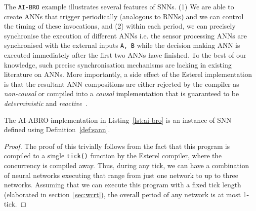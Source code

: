
The \texttt{AI-BRO} example illustrates several features of \acp{SNN}. (1) We are able to create \acp{ANN} that trigger periodically (analogous
to \acp{RNN}) and we can control the timing of these invocations, and (2) within each period, we can precisely synchronise the 
execution of different \acp{ANN} i.e. the sensor processing \acp{ANN} are synchronised with the external inputs 
\texttt{A, B} while the decision making \ac{ANN} is executed immediately after the first two \acp{ANN} have finished. 
To the best of our knowledge, such precise synchronisation mechanisms are lacking in existing literature on \acp{ANN}.
More importantly, a side effect of the Esterel implementation is that the resultant \ac{ANN} compositions are 
either rejected by the compiler as \emph{non-causal} or compiled into a \emph{causal} implementation that is guaranteed to be
\emph{deterministic} and \emph{reactive}~\cite{benveniste2003synchronous}.




\begin{prop}
	\label{lemma1}
	The AI-ABRO implementation in Listing~\ref{lst:ai-bro} is an instance of \ac{SNN} defined using Definition~\ref{def:sann}.
\end{prop}

\begin{proof}
	The proof of this trivially follows from the fact that this program is compiled to a single \texttt{tick()} function by the 
	Esterel compiler, where the concurrency is compiled away. Thus, during any tick, we can have a combination of neural networks 
	executing that range from just one network to up to three networks. Assuming that we can execute this program with a fixed tick length 
	(elaborated in section~\ref{sec:wcrt}), the overall period of any network is at most 1-tick. 
\end{proof}
